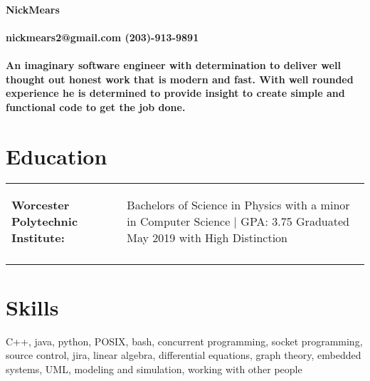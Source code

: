 \documentclass[10pt]{article}
\begin{document}
\paragraph{\centering \huge NickMears \\ }
\paragraph{\centering nickmears2@gmail.com (203)-913-9891 \\}

\paragraph{An imaginary software engineer with determination to deliver well thought out honest work that is modern and fast. With well rounded experience he is determined to provide insight to create simple and functional code to get the job done.}

\section*{Education}
\begin{tabular}{l | l}
  \begin{minipage}[t]{4cm}
    \begin{flushleft}
      \large \textbf{Worcester Polytechnic Institute:}
    \end{flushleft}
  \end{minipage} & 
  \begin{minipage}[t]{13cm}
    \begin{flushleft}
      Bachelors of Science in Physics with a minor in Computer Science $|$ GPA: 3.75 Graduated May 2019 with High Distinction
    \end{flushleft}
  \end{minipage}\\
  \multicolumn{2}{c}{}\\
\end{tabular}

\section*{Skills}
C++, java, python, POSIX, bash, concurrent programming, socket programming, source control, jira, linear algebra, differential equations, graph theory, embedded systems, UML, modeling and simulation, working with other people
\end{document}
